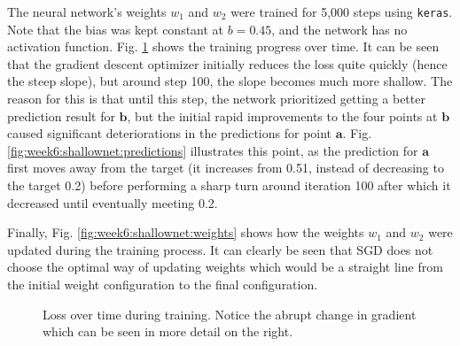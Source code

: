 \documentclass{article}
\let\vec\mathbf
\begin{document}
The neural network's weights $w_1$ and $w_2$ were trained for 5,000 steps using \texttt{keras}. 
Note that the bias was kept constant at $b=0.45$, and the network has no activation function.
Fig. \ref{fig:week6:shallownet:trainingloss} shows the training progress over time. 
It can be seen that the gradient descent optimizer initially reduces the loss quite quickly (hence the steep slope), but around step 100, the slope becomes much more shallow.
The reason for this is that until this step, the network prioritized getting a better prediction result for $\vec{b}$, but the initial rapid improvements to the four points at $\vec{b}$ caused significant deteriorations in the predictions for point $\vec{a}$.
Fig. \ref{fig:week6:shallownet:predictions} illustrates this point, as the prediction for $\vec{a}$ first moves away from the target (it increases from 0.51, instead of decreasing to the target 0.2) before performing a sharp turn around iteration 100 after which it decreased until eventually meeting 0.2.

Finally, Fig. \ref{fig:week6:shallownet:weights} shows how the weights $w_1$ and $w_2$ were updated during the training process. It can clearly be seen that SGD does not choose the optimal way of updating weights which would be a straight line from the initial weight configuration to the final configuration.

\begin{figure}[h]
    \vspace{.05\textwidth}
    \caption{Loss over time during training. Notice the abrupt change in gradient which can be seen in more detail on the right.}
    \label{fig:week6:shallownet:trainingloss}
\end{figure}
\end{document}
